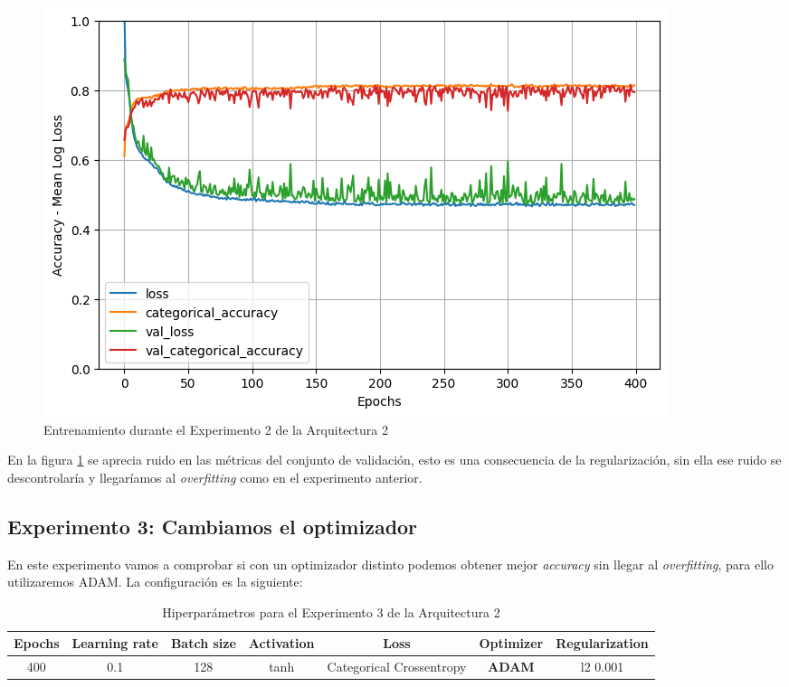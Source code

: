 \documentclass{article}
\begin{document}
			\begin{figure}[!h]
				\begin{center}
					\includegraphics[scale=0.5]{tr-a2-e2.png}		
					\caption{Entrenamiento durante el Experimento 2 de la Arquitectura 2}	
					\label{tr-a2-e2}
				\end{center}
			\end{figure}
			
			En la figura \ref{tr-a2-e2} se aprecia ruido en las m\'etricas del conjunto de validaci\'on, esto es una consecuencia de la regularizaci\'on, sin ella ese ruido se descontrolar\'ia y llegar\'iamos al \textit{overfitting} como en el experimento anterior.
			
			
		\subsection{Experimento 3: Cambiamos el optimizador}
		\label{s-a2-e3}
			En este experimento vamos a comprobar si con un optimizador distinto podemos obtener mejor \textit{accuracy} sin llegar al \textit{overfitting}, para ello utilizaremos ADAM. La configuraci\'on es la siguiente:
			
			\begin{table}[!h]
				\begin{center}
					\begin{tabular}{| c | c | c | c | c | c | c |}
						\textbf{Epochs} & \textbf{Learning rate} & \textbf{Batch size} & \textbf{Activation} & \textbf{Loss} & \textbf{Optimizer} & \textbf{Regularization} \\ \hline
						400 & 0.1 & 128 & tanh & Categorical Crossentropy & \textbf{ADAM} & l2 0.001
					\end{tabular}
					\caption{Hiperpar\'ametros para el Experimento 3 de la Arquitectura 2}
					\label{tab:hip-a2-e3}
				\end{center}
			\end{table}
			
\end{document}
